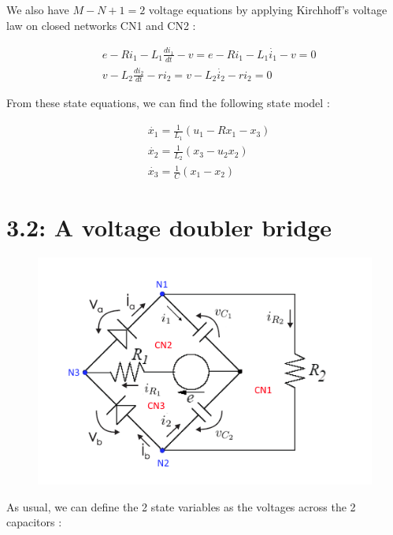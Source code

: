 We also have $M-N+1=2$ voltage equations by applying Kirchhoff's voltage law on closed networks CN1 and CN2 :

\begin{equation}
\begin{split}
&e - Ri_1 - L_1 \frac{di_1}{dt}-v=e - Ri_1 - L_1 \dot{i_1}-v=0\\
&v-L_2 \frac{di_2}{dt} - ri_2 = v-L_2 \dot{i_2} - ri_2=0
\end{split} 
\end{equation}

From these state equations, we can find the following state model :


\begin{equation}
\begin{split}
&\dot{x_1} = \frac{1}{L_1} (u_1 - Rx_1-x_3)\\
&\dot{x_2} = \frac{1}{L_2} (x_3-u_2x_2)\\
&\dot{x_3} = \frac{1}{C} (x_1-x_2)
\end{split}
\end{equation}

\newpage

\section*{3.2: A voltage doubler bridge}

\begin{figure}[htbp]
\begin{center}
\includegraphics[scale=0.8]{ex32}
\end{center}
\end{figure}

As usual, we can define the 2 state variables as the voltages across the 2 capacitors :

